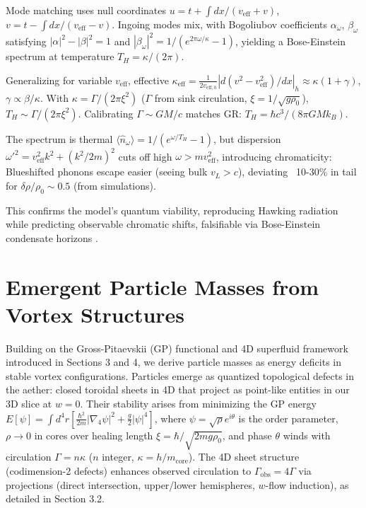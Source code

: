 \documentclass{article}
\begin{document}
Mode matching uses null coordinates $u = t + \int dx / (v_{\text{eff}} + v)$, $v = t - \int dx / (v_{\text{eff}} - v)$. Ingoing modes mix, with Bogoliubov coefficients $\alpha_\omega$, $\beta_\omega$ satisfying $|\alpha|^2 - |\beta|^2 = 1$ and $|\beta_\omega|^2 = 1 / (e^{2\pi \omega / \kappa} - 1)$, yielding a Bose-Einstein spectrum at temperature $T_H = \kappa / (2\pi)$.

Generalizing for variable $v_{\text{eff}}$, effective $\kappa_{\text{eff}} = \frac{1}{2 v_{\text{eff},h}} | d(v^2 - v_{\text{eff}}^2)/dx |_h \approx \kappa (1 + \gamma)$, $\gamma \propto \beta / \kappa$. With $\kappa = \Gamma / (2\pi \xi^2)$ ($\Gamma$ from sink circulation, $\xi = 1 / \sqrt{g \rho_0}$), $T_H \sim \Gamma / (2\pi \xi^2)$. Calibrating $\Gamma \sim G M / c$ matches GR: $T_H = \hbar c^3 / (8\pi G M k_B)$.

The spectrum is thermal $\langle \hat{n}_\omega \rangle = 1 / (e^{\omega / T_H} - 1)$, but dispersion $\omega'^2 = v_{\text{eff}}^2 k^2 + (k^2 / 2m)^2$ cuts off high $\omega > m v_{\text{eff}}^2$, introducing chromaticity: Blueshifted phonons escape easier (seeing bulk $v_L > c$), deviating ~10-30\% in tail for $\delta \rho / \rho_0 \sim 0.5$ (from simulations).

This confirms the model's quantum viability, reproducing Hawking radiation while predicting observable chromatic shifts, falsifiable via Bose-Einstein condensate horizons \cite{steinhauer2016observation}.

\section{Emergent Particle Masses from Vortex Structures}

Building on the Gross-Pitaevskii (GP) functional and 4D superfluid framework introduced in Sections 3 and 4, we derive particle masses as energy deficits in stable vortex configurations. Particles emerge as quantized topological defects in the aether: closed toroidal sheets in 4D that project as point-like entities in our 3D slice at $w=0$. Their stability arises from minimizing the GP energy $E[\psi] = \int d^4 r \left[ \frac{\hbar^2}{2 m} |\nabla_4 \psi|^2 + \frac{g}{2} |\psi|^4 \right]$, where $\psi = \sqrt{\rho} e^{i \theta}$ is the order parameter, $\rho \to 0$ in cores over healing length $\xi = \hbar / \sqrt{2 m g \rho_0}$, and phase $\theta$ winds with circulation $\Gamma = n \kappa$ ($n$ integer, $\kappa = h / m_{\text{core}}$). The 4D sheet structure (codimension-2 defects) enhances observed circulation to $\Gamma_{\text{obs}} = 4\Gamma$ via projections (direct intersection, upper/lower hemispheres, $w$-flow induction), as detailed in Section 3.2.
\end{document}
